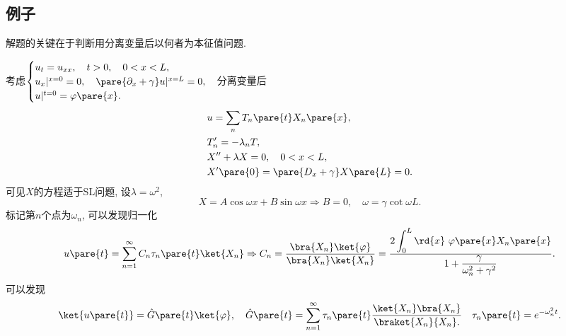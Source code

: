 \documentclass[hidelinks]{ctexart}
\begin{document}

\subsection{例子} %
\label{sub:例子}

解题的关键在于判断用分离变量后以何者为本征值问题.
\begin{sample}
    \begin{ex}
        考虑$\displaystyle \begin{cases}
            u_t = u_{xx},\quad t>0,\quad 0<x<L,\\
            u_x\vert^{x=0} = 0,\quad \pare{\partial_x + \gamma}u\vert^{x=L} = 0, \\
            u\vert^{t=0} = \varphi\pare{x}.
        \end{cases}$分离变量后
        \begin{align*}
            &u = \sum_n T_n\pare{t}X_n\pare{x}, \\
            &T'_n = -\lambda_n T, \\
            &X'' + \lambda X = 0,\quad 0 < x < L, \\
            &X'\pare{0} = \pare{D_x + \gamma}X\pare{L} = 0.
        \end{align*}
        可见$X$的方程适于SL问题, 设$\lambda = \omega^2$,
        \[ X = A \cos \omega x + B\sin \omega x \Rightarrow B=0,\quad \omega = \gamma \cot \omega L. \]
        标记第$n$个点为$\omega_n$, 可以发现归一化
        \[ u\pare{t} = \sum_{n=1}^\infty C_n\tau_n\pare{t}\ket{X_n} \Rightarrow C_n = \frac{\bra{X_n}\ket{\varphi}}{\bra{X_n}\ket{X_n}} = \frac{\displaystyle 2\int_0^L \rd{x}\ \varphi\pare{x}X_n\pare{x}}{\displaystyle 1+\frac{\gamma}{\omega_n^2 + \gamma^2}}. \]
        可以发现
        \[ \ket{u\pare{t}} = \hat{G}\pare{t}\ket{\varphi},\quad \hat{G}\pare{t} = \sum_{n=1}^\infty \tau_n\pare{t}\frac{\ket{X_n}\bra{X_n}}{\braket{X_n}{X_n}.}\quad \tau_n\pare{t} = e^{-\omega_n^2 t}. \]
    \end{ex}
\end{sample}
\end{document}
